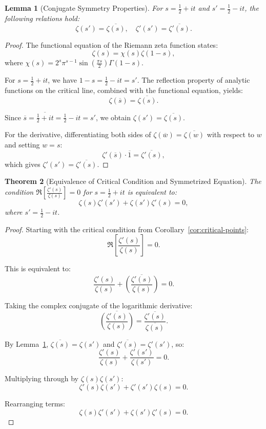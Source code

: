 \documentclass[11pt,a4paper]{article}
\newtheorem{theorem}{Theorem}[section]
\newtheorem{lemma}[theorem]{Lemma}
\begin{document}
\begin{lemma}[Conjugate Symmetry Properties]\label{lem:conjugate-symmetry}
For $s = \frac{1}{2} + it$ and $s' = \frac{1}{2} - it$, the following relations hold:
$$\zeta(s') = \overline{\zeta(s)}, \quad \zeta'(s') = \overline{\zeta'(s)}.$$
\end{lemma}

\begin{proof}
The functional equation of the Riemann zeta function states:
$$\zeta(s) = \chi(s)\zeta(1-s),$$
where $\chi(s) = 2^s \pi^{s-1} \sin\left(\frac{\pi s}{2}\right) \Gamma(1-s)$.

For $s = \frac{1}{2} + it$, we have $1-s = \frac{1}{2} - it = s'$. The reflection property of analytic functions on the critical line, combined with the functional equation, yields:
$$\zeta(\overline{s}) = \overline{\zeta(s)}.$$

Since $\overline{s} = \overline{\frac{1}{2} + it} = \frac{1}{2} - it = s'$, we obtain $\zeta(s') = \overline{\zeta(s)}$.

For the derivative, differentiating both sides of $\zeta(\overline{w}) = \overline{\zeta(w)}$ with respect to $w$ and setting $w = s$:
$$\zeta'(\overline{s}) \cdot \overline{1} = \overline{\zeta'(s)},$$
which gives $\zeta'(s') = \overline{\zeta'(s)}$.
\end{proof}

\begin{theorem}[Equivalence of Critical Condition and Symmetrized Equation]\label{thm:equivalence}
The condition $\Re\left[\frac{\zeta'(s)}{\zeta(s)}\right] = 0$ for $s = \frac{1}{2} + it$ is equivalent to:
$$\zeta(s)\zeta'(s') + \zeta(s')\zeta'(s) = 0,$$
where $s' = \frac{1}{2} - it$.
\end{theorem}

\begin{proof}
Starting with the critical condition from Corollary~\ref{cor:critical-points}:
$$\Re\left[\frac{\zeta'(s)}{\zeta(s)}\right] = 0.$$

This is equivalent to:
$$\frac{\zeta'(s)}{\zeta(s)} + \overline{\left(\frac{\zeta'(s)}{\zeta(s)}\right)} = 0.$$

Taking the complex conjugate of the logarithmic derivative:
$$\overline{\left(\frac{\zeta'(s)}{\zeta(s)}\right)} = \frac{\overline{\zeta'(s)}}{\overline{\zeta(s)}}.$$

By Lemma~\ref{lem:conjugate-symmetry}, $\overline{\zeta(s)} = \zeta(s')$ and $\overline{\zeta'(s)} = \zeta'(s')$, so:
$$\frac{\zeta'(s)}{\zeta(s)} + \frac{\zeta'(s')}{\zeta(s')} = 0.$$

Multiplying through by $\zeta(s)\zeta(s')$:
$$\zeta'(s)\zeta(s') + \zeta'(s')\zeta(s) = 0.$$

Rearranging terms:
$$\zeta(s)\zeta'(s') + \zeta(s')\zeta'(s) = 0.$$
\end{proof}
\end{document}

